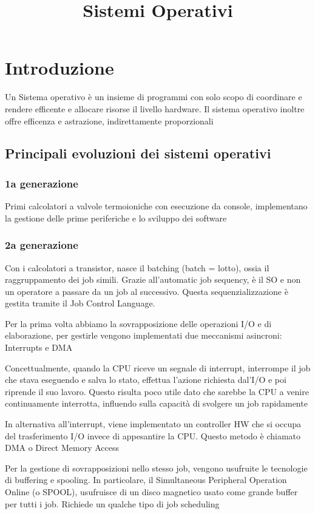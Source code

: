 \documentclass[12pt, a4paper]{article}
\title{Sistemi Operativi}
\begin{document}
\section{Introduzione}

Un Sistema operativo è un insieme di programmi con solo scopo di coordinare e rendere efficente e allocare 
risorse il livello hardware. Il sistema operativo inoltre offre efficenza e astrazione, indirettamente 
proporzionali

\subsection{Principali evoluzioni dei sistemi operativi}
\subsubsection{1a generazione}
Primi calcolatori a valvole termoioniche con esecuzione da console, implementano la gestione delle prime periferiche
e lo sviluppo dei software

\subsubsection{2a generazione}
Con i calcolatori a transistor, nasce il batching (batch = lotto), ossia il raggruppamento dei job simili. Grazie 
all'automatic job sequency, è il SO e non un operatore a passare da un job al successivo. Questa sequenzializzazione
è gestita tramite il Job Control Language. 

Per la prima volta abbiamo la sovrapposizione delle operazioni I/O e di elaborazione, per gestirle vengono 
implementati due meccanismi asincroni: Interrupts e DMA

Concettualmente, quando la CPU riceve un segnale di interrupt, interrompe il job che stava eseguendo e salva lo
stato, effettua l'azione richiesta dal'I/O e poi riprende il suo lavoro. Questo risulta poco utile dato che 
sarebbe la CPU a venire continuamente interrotta, influendo sulla capacità di svolgere un job rapidamente

In alternativa all'interrupt, viene implementato un controller HW che si occupa del trasferimento I/O invece di 
appesantire la CPU. Questo metodo è chiamato DMA o Direct Memory Access


Per la gestione di sovrapposizioni nello stesso job, vengono usufruite le tecnologie di buffering e spooling.
In particolare, il Simultaneous Peripheral Operation Online (o SPOOL), usufruisce di un disco magnetico usato 
come grande buffer per tutti i job. Richiede un qualche tipo di job scheduling
\end{document}
